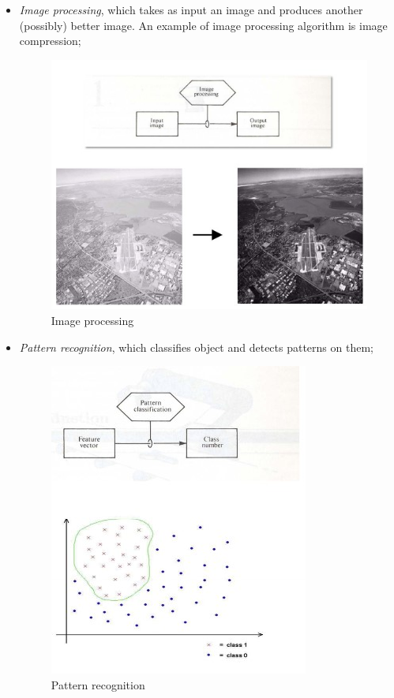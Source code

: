 \begin{itemize}
    \item \textit{Image processing}, which takes as input an image and produces another (possibly) better image. An example of image processing algorithm is image compression;

    \begin{figure}[h!]
		\centering
		\includegraphics[scale = 1.5]{img/image processing.jpg}
		\caption{Image processing}
    \end{figure}

    \item \textit{Pattern recognition}, which classifies object and detects patterns on them;

    \begin{figure}[H]
		\centering
		\includegraphics[scale = 1.5]{img/pattern recognition.jpg}
		\caption{Pattern recognition}
    \end{figure}


\end{itemize}
